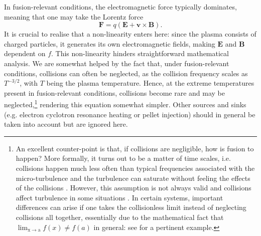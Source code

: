 In fusion-relevant conditions, the electromagnetic force typically dominates, meaning that one may take the Lorentz force
\begin{equation}
    \boldsymbol{F} = q \left( \boldsymbol{E} + \boldsymbol{v} \times \boldsymbol{B} \right).
\end{equation}
It is crucial to realise that a non-linearity enters here: since the plasma consists of charged particles, it generates its own electromagnetic fields, making $\boldsymbol{E}$ and $\boldsymbol{B}$ dependent on $f$. This non-linearity hinders straightforward mathematical analysis. We are somewhat helped by the fact that, under fusion-relevant conditions, collisions can often be neglected, as the collision frequency scales as $T^{-3/2}$, with $T$ being the plasma temperature. Hence, at the extreme temperatures present in fusion-relevant conditions, collisions become rare and may be neglected,\footnote{An excellent counter-point is that, if collisions are negligible, how is fusion to happen? More formally, it turns out to be a matter of time scales, i.e. collisions happen much less often than typical frequencies associated with the micro-turbulence and the turbulence can saturate without feeling the effects of the collisions \cite{garbet2010gyrokinetic}. However, this assumption is not always valid and collisions affect turbulence in some situations \cite{rewoldt1990toroidal,lin1999effects,falchetto2004effect,morren2022influence}. In certain systems, important differences can arise if one takes the collisionless limit instead of neglecting collisions all together, essentially due to the mathematical fact that $\lim_{\mathrm{x \rightarrow a}} f(x) \neq f(a)$ in general: see \citet{ng2021landau} for a pertinent example.} rendering this equation somewhat simpler. Other sources and sinks (e.g. electron cyclotron resonance heating or pellet injection) should in general be taken into account but are ignored here. \par

